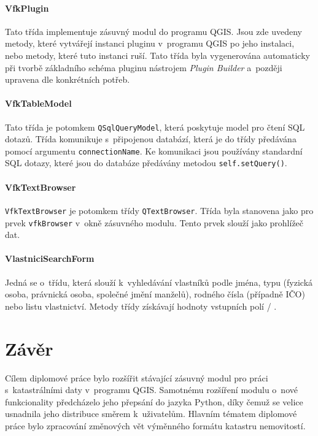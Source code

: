 \documentclass[a4paper,12pt,oneside]{book}
\begin{document}
\subsubsection{VfkPlugin}
Tato třída implementuje zásuvný modul do programu QGIS. Jsou zde
uvedeny metody, které vytvářejí instanci pluginu v~programu QGIS po
jeho instalaci, nebo metody, které tuto instanci ruší. Tato třída byla
vygenerována automaticky při tvorbě základního schéma pluginu
nástrojem \textit{Plugin Builder} a~později upravena dle konkrétních
potřeb.

\subsubsection{VfkTableModel}
Tato třída je potomkem \texttt{QSqlQueryModel}, která poskytuje
model pro čtení SQL dotazů. Třída komunikuje s~připojenou databází,
která je do třídy předávána pomocí argumentu
\texttt{connectionName}. Ke komunikaci jsou používány standardní SQL
dotazy, které jsou do databáze předávány metodou
\texttt{self.setQuery()}.

\subsubsection{VfkTextBrowser}
\texttt{VfkTextBrowser} je potomkem třídy \texttt{QTextBrowser}. Třída
byla stanovena jako  pro prvek \texttt{vfkBrowser} v~okně
zásuvného modulu. Tento prvek slouží jako prohlížeč dat.

\subsubsection{VlastniciSearchForm}
Jedná se o~třídu, která slouží k~vyhledávání vlastníků podle jména,
typu (fyzická osoba, právnická osoba, společné jmění manželů), rodného
čísla (případně IČO) nebo listu vlastnictví. Metody třídy získávají
hodnoty vstupních polí / .


\clearpage
{}       %
\chapter*{Závěr}


Cílem diplomové práce bylo rozšířit stávající zásuvný modul pro práci
s~katastrálními daty v~programu QGIS. Samotnému rozšíření modulu
o~nové funkcionality předcházelo jeho přepsání do jazyka Python, díky
čemuž se velice usnadnila jeho distribuce směrem k~uživatelům. Hlavním
tématem diplomové práce bylo zpracování změnových vět výměnného
formátu katastru nemovitostí.
\end{document}

